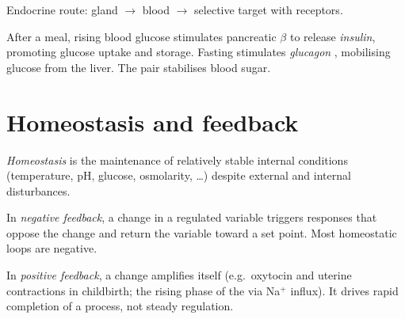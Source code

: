 \begin{omfigure}

{\small Endocrine route: gland $\to$ blood $\to$ selective target with
receptors.}
\end{omfigure}

\begin{example}\label{ex:g12:nerves-hormones:insulin}
After a  meal, rising blood glucose stimulates pancreatic
$\beta$  to release \emph{insulin}, promoting
glucose uptake and storage. Fasting stimulates \emph{glucagon}
, mobilising glucose from the liver. The pair stabilises
blood sugar.
\end{example}

\section{Homeostasis and feedback}

\begin{definition}[Homeostasis]\label{def:g12:nerves-hormones:homeostasis}
\emph{Homeostasis} is the maintenance of relatively
stable internal conditions (temperature, pH, glucose, osmolarity, \ldots)
despite external and internal disturbances.
\end{definition}

\begin{definition}
\label{def:g12:nerves-hormones:negative}
In \emph{negative feedback}, a change in a
regulated variable triggers responses that oppose the change and return
the variable toward a set point. Most homeostatic loops are negative.
\end{definition}

\begin{definition}
\label{def:g12:nerves-hormones:positive}
In \emph{positive feedback}, a change amplifies
itself (e.g.\ oxytocin and uterine contractions in childbirth; the rising
phase of the  via Na$^{+}$ influx). It drives rapid
completion of a process, not steady regulation.
\end{definition}

